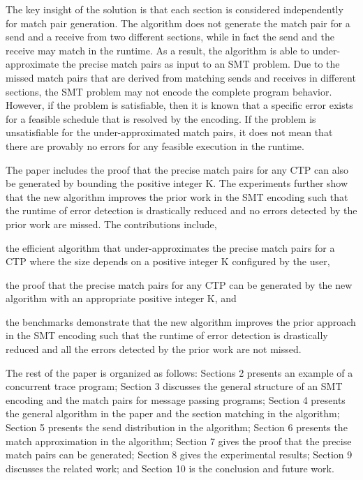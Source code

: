 The key insight of the solution is that each section is considered independently for match pair generation.  
The algorithm does not generate the match pair for a send and a receive from two different sections, while in fact the send and the receive may match in the runtime. 
As a result, the algorithm is able to under-approximate the precise match pairs as input to an SMT problem. 
Due to the missed match pairs that are derived from matching sends and receives in different sections, the SMT problem may not encode the complete program behavior. However, if the problem is satisfiable, then it is known that a specific error exists for a feasible schedule that is resolved by the encoding. If the problem is unsatisfiable for the under-approximated match pairs, it does not mean that there are provably no errors for any feasible execution in the runtime.

The paper includes the proof that the precise match pairs for any CTP can also be generated by bounding the positive integer K. The experiments further show that the new algorithm improves the prior work in the SMT encoding such that the runtime of error detection is drastically reduced and no errors detected by the prior work are missed.
The contributions include,
\begin{compactitem}
\item the efficient algorithm that under-approximates the precise match pairs for a CTP where the size depends on a positive integer K configured by the user,
\item the proof that the precise match pairs for any CTP can be generated by the new algorithm with an appropriate positive integer K, and
\item the benchmarks demonstrate that the new algorithm improves the prior approach in the SMT encoding such that the runtime of error detection is drastically reduced and all the errors detected by the prior work are not missed. 
\end{compactitem}

The rest of the paper is organized as follows: 
Sections 2 presents an example of a concurrent trace program; Section 3 discusses the general structure of an SMT encoding and the match pairs for message passing programs;  Section 4 presents the general algorithm in the paper and the section matching in the algorithm; Section 5 presents the send distribution in the algorithm; Section 6 presents the match approximation in the algorithm; Section 7 gives the proof that the precise match pairs can be generated; Section 8 gives the experimental results; Section 9 discusses the related work; and Section 10 is the conclusion and future work.
